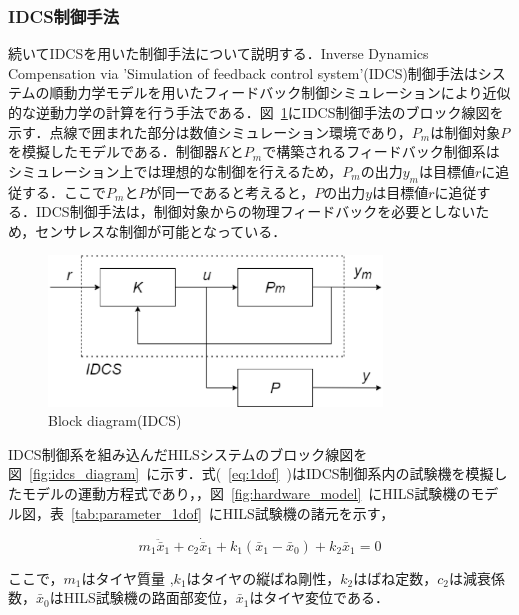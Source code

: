 \documentclass[a4paper,12pt]{article_vdlab_sotsuron}
\begin{document}
\subsubsection{IDCS制御手法}
\label{sec:sub_method_idcs}
続いてIDCSを用いた制御手法について説明する．Inverse Dynamics Compensation via 'Simulation of feedback control system'(IDCS)制御手法はシステムの順動力学モデルを用いたフィードバック制御シミュレーションにより近似的な逆動力学の計算を行う手法である\cite{method_idcs}．図~\ref{fig:idcs_block}にIDCS制御手法のブロック線図を示す．点線で囲まれた部分は数値シミュレーション環境であり，$P_m$は制御対象$P$を模擬したモデルである．制御器$K$と$P_m$で構築されるフィードバック制御系はシミュレーション上では理想的な制御を行えるため，$P_m$の出力$y_m$は目標値$r$に追従する．ここで$P_m$と$P$が同一であると考えると，$P$の出力$y$は目標値$r$に追従する．IDCS制御手法は，制御対象からの物理フィードバックを必要としないため，センサレスな制御が可能となっている．

\vspace*{10mm}
\begin{figure}[htp]
  \begin{center}
    \includegraphics[height=40mm]{figure/idcs_block.eps}
    \vspace*{3mm}
    \caption{Block diagram(IDCS)}
    \label{fig:idcs_block}
  \end{center}
\end{figure}

\newpage
IDCS制御系を組み込んだHILSシステムのブロック線図を図~\ref{fig:idcs_diagram}~に示す．式(~\ref{eq:1dof}~)はIDCS制御系内の試験機を模擬したモデルの運動方程式であり，，図~\ref{fig:hardware_model}~にHILS試験機のモデル図，表~\ref{tab:parameter_1dof}~にHILS試験機の諸元を示す，

\begin{equation}
  m_1\ddot{\bar{x}}_1+c_2\dot{\bar{x}}_1+k_1(\bar{x}_1-\bar{x}_0)+k_2\bar{x}_1=0 \label{eq:1dof}
\end{equation}

ここで，$m_1$はタイヤ質量 ,$k_1$はタイヤの縦ばね剛性，$k_2$はばね定数，$c_2$は減衰係数，$\bar{x}_0$はHILS試験機の路面部変位，$\bar{x}_1$はタイヤ変位である．
\end{document}
